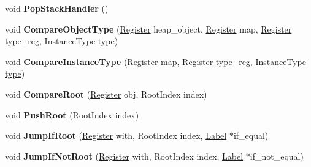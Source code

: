 \begin{DoxyCompactItemize}
void {\bfseries Pop\+Stack\+Handler} ()
\item 
\mbox{\label{classv8_1_1internal_1_1MacroAssembler_a3c12ff43e4dc21fa5a9ddc0384641ed0}} 
void {\bfseries Compare\+Object\+Type} (\mbox{\hyperlink{classv8_1_1internal_1_1Register}{Register}} heap\+\_\+object, \mbox{\hyperlink{classv8_1_1internal_1_1Register}{Register}} map, \mbox{\hyperlink{classv8_1_1internal_1_1Register}{Register}} type\+\_\+reg, Instance\+Type \mbox{\hyperlink{classstd_1_1conditional_1_1type}{type}})
\item 
\mbox{\label{classv8_1_1internal_1_1MacroAssembler_a18c4f37a00c2903da694afa03f600688}} 
void {\bfseries Compare\+Instance\+Type} (\mbox{\hyperlink{classv8_1_1internal_1_1Register}{Register}} map, \mbox{\hyperlink{classv8_1_1internal_1_1Register}{Register}} type\+\_\+reg, Instance\+Type \mbox{\hyperlink{classstd_1_1conditional_1_1type}{type}})
\item 
\mbox{\label{classv8_1_1internal_1_1MacroAssembler_a3642eebbecf811ee033559ce6556ef25}} 
void {\bfseries Compare\+Root} (\mbox{\hyperlink{classv8_1_1internal_1_1Register}{Register}} obj, Root\+Index index)
\item 
\mbox{\label{classv8_1_1internal_1_1MacroAssembler_a91239e2f90525c993ce4dacef2b8219c}} 
void {\bfseries Push\+Root} (Root\+Index index)
\item 
\mbox{\label{classv8_1_1internal_1_1MacroAssembler_a026e7752dc80a8ac2c86242c713de128}} 
void {\bfseries Jump\+If\+Root} (\mbox{\hyperlink{classv8_1_1internal_1_1Register}{Register}} with, Root\+Index index, \mbox{\hyperlink{classv8_1_1internal_1_1Label}{Label}} $\ast$if\+\_\+equal)
\item 
\mbox{\label{classv8_1_1internal_1_1MacroAssembler_a2c433ea6b27ac33ad2b6ef6b1a751eb9}} 
void {\bfseries Jump\+If\+Not\+Root} (\mbox{\hyperlink{classv8_1_1internal_1_1Register}{Register}} with, Root\+Index index, \mbox{\hyperlink{classv8_1_1internal_1_1Label}{Label}} $\ast$if\+\_\+not\+\_\+equal)
\item 
\mbox{\label{classv8_1_1internal_1_1MacroAssembler_aa394f8b7b9f54b3a1638eedf20eb013a}} 

\end{DoxyCompactItemize}
